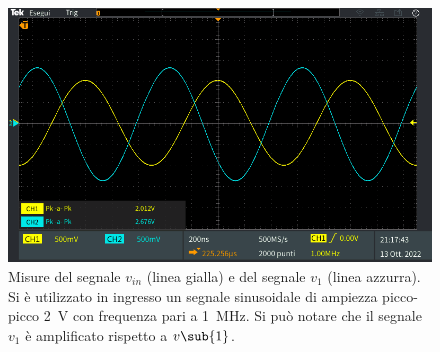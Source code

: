\begin{figure}[h]
	\centering
	\includegraphics[width=1\linewidth]{./ImageFiles/Laboratorio 2/TEK00050}
	\caption{Misure del segnale $v_{in}$ (linea gialla) e del segnale $v_{1}$ (linea azzurra). Si è utilizzato in ingresso un segnale sinusoidale di ampiezza picco-picco \SI{2}{\volt} con frequenza pari a \SI{1}{\mega\hertz}. Si può notare che il segnale $v_{1}$ è amplificato rispetto a $v\sub{1}$.}
	\label{fig:analisi_circuito_3_3}
\end{figure}